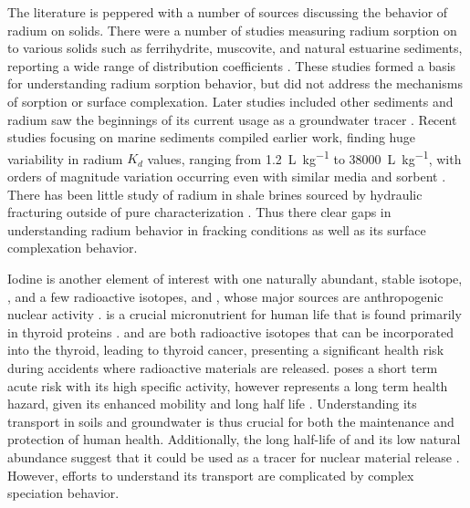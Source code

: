 \documentclass[twoside,12pt,titlepage]{article}
\newcommand{\isotope}[2]{\ch{^{#1}#2}}
\begin{document}
\par The literature is peppered with a number of sources discussing the behavior of radium on solids. There were a number of studies measuring radium sorption on to various solids such as ferrihydrite, muscovite, and natural estuarine sediments, reporting a wide range of distribution coefficients \cite{Ames1983a,Ames1983b,Benes1984}. These studies formed a basis for understanding radium sorption behavior, but did not address the mechanisms of sorption or surface complexation. Later studies included other sediments \cite{Tachi2001} and radium saw the beginnings of its current usage as a groundwater tracer \cite{Moore1996}. Recent studies focusing on marine sediments compiled earlier work, finding huge variability in radium $K_d$ values, ranging from \SI{1.2}{\liter\per\kilo\gram} to \SI{38000}{\liter\per\kilo\gram}, with orders of magnitude variation occurring even with similar media and sorbent \cite{Beck2013}. There has been little study of radium in shale brines sourced by hydraulic fracturing outside of pure characterization \cite{Barbot2013,Rowan2011}. Thus there clear gaps in understanding radium behavior in fracking conditions as well as its surface complexation behavior.
\par Iodine is another element of interest with one naturally abundant, stable isotope, \isotope{127}{I}, and a few radioactive isotopes, \isotope{129}{I} and \isotope{131}{I}, whose major sources are anthropogenic nuclear activity \cite{He2013,Landis2012}. \isotope{127}{I} is a crucial micronutrient for human life that is found primarily in thyroid proteins \cite{Hu2009}. \isotope{129}{I} and \isotope{131}{I} are both radioactive isotopes that can be incorporated into the thyroid, leading to thyroid cancer, presenting a significant health risk during accidents where radioactive materials are released. \isotope{131}{I} poses a short term acute risk with its high specific activity, however \isotope{129}{I} represents a long term health hazard, given its enhanced mobility and long half life \cite{Emerson2014}. Understanding its transport in soils and groundwater is thus crucial for both the maintenance and protection of human health. Additionally, the long half-life of \isotope{129}{I} and its low natural abundance suggest that it could be used as a tracer for nuclear material release \cite{He2013}. However, efforts to understand its transport are complicated by complex speciation behavior.
\end{document}
